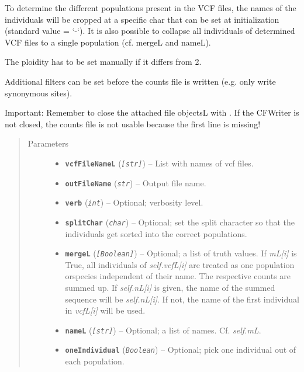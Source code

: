 \documentclass[letterpaper,10pt,english]{sphinxmanual}
\begin{document}
\begin{fulllineitems}
To determine the different populations present in the VCF files,
the names of the individuals will be cropped at a specific char
that can be set at initialization (standard value = `-`). It is
also possible to collapse all individuals of determined VCF files
to a single population (cf. mergeL and nameL).

The ploidity has to be set manually if it differs from 2.

Additional filters can be set before the counts file is written
(e.g. only write synonymous sites).

Important: Remember to close the attached file objectsL with
{\hyperref[cf:libPoMo.cf.CFWriter.close]{}}.  If the CFWriter is not closed, the counts file
is not usable because the first line is missing!
\begin{quote}\begin{description}
\item[{Parameters}] \leavevmode\begin{itemize}
\item {} 
\textbf{\texttt{vcfFileNameL}} (\emph{\texttt{{[}str{]}}}) -- List with names of vcf files.

\item {} 
\textbf{\texttt{outFileName}} (\emph{\texttt{str}}) -- Output file name.

\item {} 
\textbf{\texttt{verb}} (\emph{\texttt{int}}) -- Optional; verbosity level.

\item {} 
\textbf{\texttt{splitChar}} (\emph{\texttt{char}}) -- Optional; set the split character so that
the individuals get sorted into the correct populations.

\item {} 
\textbf{\texttt{mergeL}} (\emph{\texttt{{[}Boolean{]}}}) -- Optional; a list of truth values.  If
\emph{mL{[}i{]}} is True, all individuals of \emph{self.vcfL{[}i{]}} are treated as
one population orspecies independent of their name.  The
respective counts are summed up.  If \emph{self.nL{[}i{]}} is given, the
name of the summed sequence will be \emph{self.nL{[}i{]}}.  If not, the
name of the first individual in \emph{vcfL{[}i{]}} will be used.

\item {} 
\textbf{\texttt{nameL}} (\emph{\texttt{{[}str{]}}}) -- Optional; a list of names. Cf. \emph{self.mL}.

\item {} 
\textbf{\texttt{oneIndividual}} (\emph{\texttt{Boolean}}) -- Optional; pick one individual out
of each population.


\end{itemize}
\end{description}
\end{quote}
\end{fulllineitems}
\end{document}
